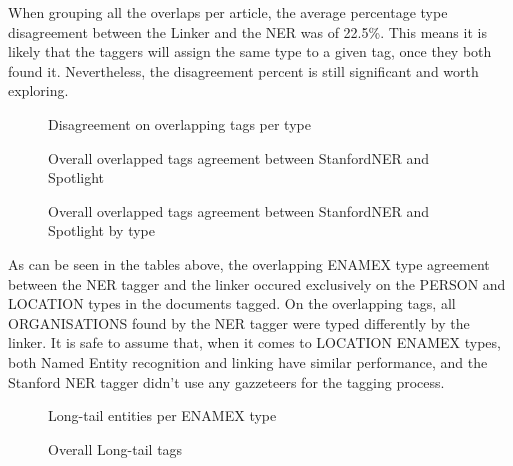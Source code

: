 When grouping all the overlaps per article, the average percentage type disagreement between the Linker and the NER was of 22.5\%.
This means it is likely that the taggers will assign the same type to a given tag, once they both found it.
Nevertheless, the disagreement percent is still significant and worth exploring.

\begin{figure}[h]
    \label{fig:disagreementpertype}
    \centering
    \caption{Disagreement on overlapping tags per type}
\end{figure}

\begin{figure}[h]
    \label{fig:agreementvsdisagreementpercent}
    \centering
    \caption{Overall overlapped tags agreement between StanfordNER and Spotlight}
\end{figure}

\begin{figure}[h]
    \label{fig:agreementnernelbytype}
    \centering
    \caption{Overall overlapped tags agreement between StanfordNER and Spotlight by type}
\end{figure}

As can be seen in the tables above, the overlapping ENAMEX type agreement between the NER tagger and the linker occured exclusively on
the PERSON and LOCATION types in the documents tagged.
On the overlapping tags, all ORGANISATIONS found by the NER tagger were typed differently by the linker.
It is safe to assume that, when it comes to LOCATION ENAMEX types, both Named Entity recognition and linking have similar performance,
and the Stanford NER tagger didn't use any gazzeteers\cite{stanfordfaq} for the tagging process.

  \begin{figure}[h]
      \label{fig:longtailpertype}
      \centering
      \caption{Long-tail entities per ENAMEX type}
  \end{figure}%

  \begin{figure}[h]
      \label{fig:longtail}
      \centering
      \caption{Overall Long-tail tags}
  \end{figure}

